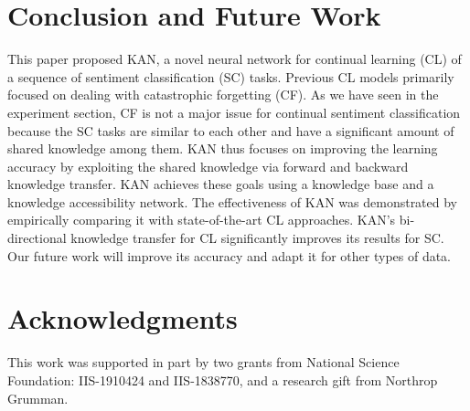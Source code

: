 \documentclass[runningheads]{llncs}
\begin{document}
\section{Conclusion and Future Work}
\label{sec:conclusion}
This paper proposed KAN, a novel neural network for continual learning (CL) of a sequence of sentiment classification (SC) tasks. Previous CL models primarily focused on dealing with catastrophic forgetting (CF). As we have seen in the experiment section, CF is not a major issue for continual sentiment classification because the SC tasks are similar to each other and have a significant amount of shared knowledge among them. KAN thus focuses on improving the learning accuracy by exploiting the shared knowledge via forward and backward knowledge transfer. KAN achieves these goals using a knowledge base and a knowledge accessibility network. The effectiveness of KAN was demonstrated by empirically comparing it with state-of-the-art CL approaches. KAN's bi-directional knowledge transfer for CL significantly improves its results for SC. Our future work will improve its accuracy and adapt it for other types of data.

\section*{Acknowledgments}
This work was supported in part by two grants from National Science Foundation: IIS-1910424 and IIS-1838770, and a research gift from Northrop Grumman.



\end{document}
